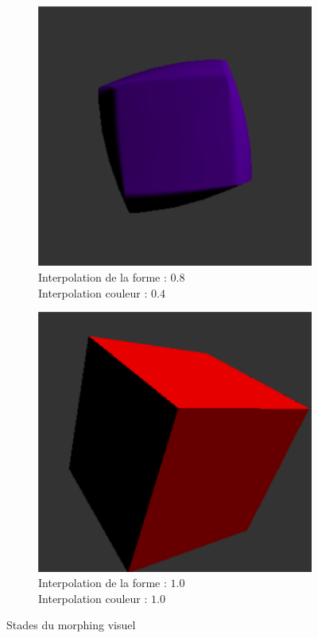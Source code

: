 \begin{figure}
\begin{subfigure}{.5\textwidth}
  \centering
  \includegraphics[width=1\linewidth]{Graphs/morph3.png}  
  \caption{Interpolation de la forme : $0.8$ \\ Interpolation couleur : $0.4$}
  \label{fig:sub-third}
\end{subfigure}
\begin{subfigure}{.5\textwidth}
  \centering
  \includegraphics[width=1\linewidth]{Graphs/morph4.png}  
  \caption{Interpolation de la forme : $1.0$ \\ Interpolation couleur : $1.0$}
  \label{fig:sub-fourth}
\end{subfigure}
\caption{Stades du morphing visuel}
\label{fig:fig}
\end{figure}

